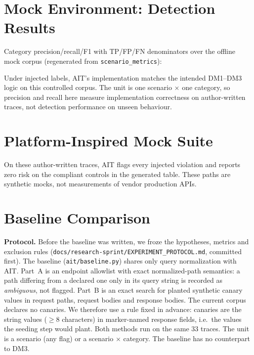 \documentclass[12pt,a4paper]{report}
\begin{document}
\section{Mock Environment: Detection Results}

Category precision/recall/F1 with TP/FP/FN denominators over the offline
mock corpus (regenerated from \texttt{scenario\_metrics}):

\begin{table}[H]
    \centering
    \caption{Detection Performance, Offline Mock Corpus (category metrics
    with micro-average; implementation validation under injected labels)}
    \label{tab:mock-results}
    \footnotesize
    
\end{table}

Under injected labels, AIT's implementation matches the intended DM1--DM3 logic
on this controlled corpus. The unit is one scenario $\times$ one category, so precision and
recall here measure implementation correctness on author-written traces, not detection
performance on unseen behaviour.

\section{Platform-Inspired Mock Suite}

\begin{table}[H]
    \centering
    \caption{Platform-Inspired Mock Results (risk scores from offline
    scenario artifacts; synthetic mocks)}
    \label{tab:platform-results}
    \footnotesize
    
\end{table}

On these author-written traces, AIT flags every injected violation and reports zero risk on
the compliant controls in the generated table. These paths are synthetic mocks, not
measurements of vendor production APIs.

\section{Baseline Comparison}
\label{sec:baseline}

\textbf{Protocol.} Before the baseline was written, we froze the hypotheses, metrics and
exclusion rules (\texttt{docs/research-sprint/EXPERIMENT\_PROTOCOL.md}, committed first). The
baseline (\texttt{ait/baseline.py}) shares only query normalization with AIT. Part~A is an
endpoint allowlist with exact normalized-path semantics: a path differing from a declared one only
in its query string is recorded as \emph{ambiguous}, not flagged. Part~B is an exact search for
planted synthetic canary values in request paths, request bodies and response bodies. The
current corpus declares no canaries. We therefore use a rule fixed in advance: canaries are the
string values ($\geq$8 characters) in marker-named response fields, i.e.\ the values the seeding
step would plant. Both methods run on the same 33 traces. The unit is a scenario (any flag) or
a scenario $\times$ category. The baseline has no counterpart to DM3.
\end{document}

